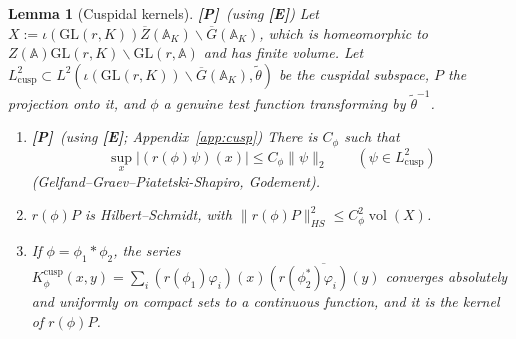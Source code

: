 \documentclass[12pt]{article}
\newcommand{\ov}[1]{\overline{#1}}
\newcommand{\A}{\mathbb{A}}
\newcommand{\vol}{\operatorname{vol}}
\newcommand{\GL}{\mathrm{GL}}
\newcommand{\Gb}{\ov{G}}
\newcommand{\Zb}{\ov{Z}}
\newcommand{\Pv}{\textbf{[P]}}
\newcommand{\Ev}{\textbf{[E]}}
\theoremstyle{plain}
\newtheorem{lemma}[theorem]{Lemma}
\theoremstyle{definition}
\begin{document}
\begin{lemma}[Cuspidal kernels]\label{lem:A1}\Pv\ (using \Ev)
Let $X:=\iota(\GL(r,K))\Zb(\A_K)\backslash\Gb(\A_K)$, which is homeomorphic to $Z(\A)\GL(r,K)\backslash\GL(r,\A)$ and has finite volume. Let $L^2_{\mathrm{cusp}}\subset L^2(\iota(\GL(r,K))\backslash\Gb(\A_K),\tilde\theta)$ be the cuspidal subspace, $P$ the projection onto it, and $\phi$ a genuine test function transforming by $\tilde\theta^{-1}$.
\begin{enumerate}[label=(\alph*)]
\item \Pv\ (using \Ev; Appendix~\ref{app:cusp}) There is $C_\phi$ such that
\[ \sup_{x}|(r(\phi)\psi)(x)|\le C_\phi\|\psi\|_2\qquad(\psi\in L^2_{\mathrm{cusp}}) \]
(Gelfand--Graev--Piatetski-Shapiro, Godement).
\item $r(\phi)P$ is Hilbert--Schmidt, with $\|r(\phi)P\|_{HS}^2\le C_\phi^2\vol(X)$.
\item If $\phi=\phi_1*\phi_2$, the series $K^{\mathrm{cusp}}_\phi(x,y)=\sum_i(r(\phi_1)\varphi_i)(x)\ov{(r(\phi_2^*)\varphi_i)(y)}$ converges absolutely and uniformly on compact sets to a continuous function, and it is the kernel of $r(\phi)P$.
\end{enumerate}
\end{lemma}
\end{document}
